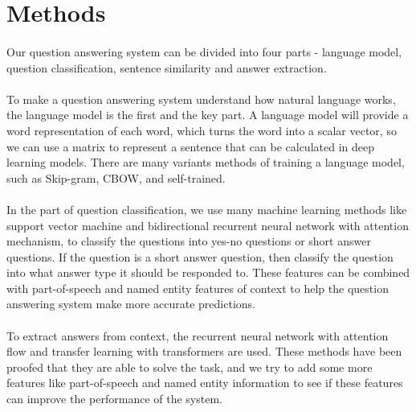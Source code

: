\documentclass{article}
\begin{document}
\section{Methods}
\paragraph{}
Our question answering system can be divided into four parts - language model, question classification, sentence similarity and answer extraction.

\paragraph{}
To make a question answering system understand how natural language works, the language model is the first and the key part. A language model will provide a word representation of each word, which turns the word into a scalar vector, so we can use a matrix to represent a sentence that can be calculated in deep learning models. There are many variants methods of training a language model, such as Skip-gram, CBOW, and self-trained.

\paragraph{}
In the part of question classification, we use many machine learning methods like support vector machine and bidirectional recurrent neural network with attention mechanism, to classify the questions into yes-no questions or short answer questions. If the question is a short answer question, then classify the question into what answer type it should be responded to. These features can be combined with part-of-speech and named entity features of context to help the question answering system make more accurate predictions.

\paragraph{}
To extract answers from context, the recurrent neural network with attention flow and transfer learning with transformers are used. These methods have been proofed that they are able to solve the task, and we try to add some more features like part-of-speech and named entity information to see if these features can improve the performance of the system.
\end{document}
